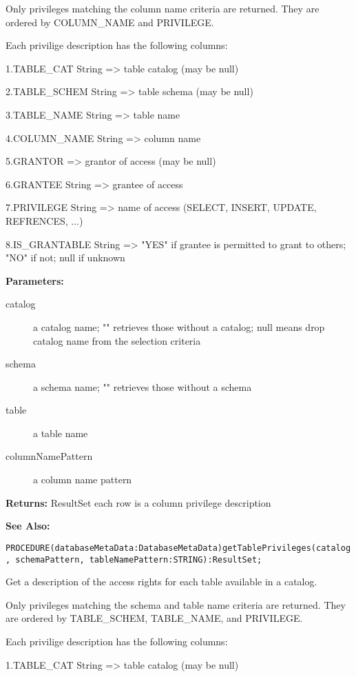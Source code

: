 Only privileges matching the column name criteria are returned. They are ordered by COLUMN\_NAME and PRIVILEGE. 

Each privilige description has the following columns: 

1.TABLE\_CAT String => table catalog (may be null) 

2.TABLE\_SCHEM String => table schema (may be null) 

3.TABLE\_NAME String => table name 

4.COLUMN\_NAME String => column name 

5.GRANTOR => grantor of access (may be null) 

6.GRANTEE String => grantee of access 

7.PRIVILEGE String => name of access (SELECT, INSERT, UPDATE, REFRENCES, ...) 

8.IS\_GRANTABLE String => "YES" if grantee is permitted to grant to others; "NO" if not; null if unknown 


{\bf Parameters: }
\begin{description}
\item[catalog] a catalog name; "" retrieves those without a catalog; null means drop catalog name from the selection criteria 
\item[schema] a schema name; "" retrieves those without a schema 
\item[table] a table name 
\item[columnNamePattern] a column name pattern 
\end{description}

{\bf Returns: } 
ResultSet each row is a column privilege description 

{\bf See Also:} 




\verb'PROCEDURE(databaseMetaData:DatabaseMetaData)getTablePrivileges(catalog, schemaPattern, tableNamePattern:STRING):ResultSet;'





Get a description of the access rights for each table available in a catalog. 

Only privileges matching the schema and table name criteria are returned. They are ordered by TABLE\_SCHEM, TABLE\_NAME, and PRIVILEGE. 

Each privilige description has the following columns: 

1.TABLE\_CAT String => table catalog (may be null) 

